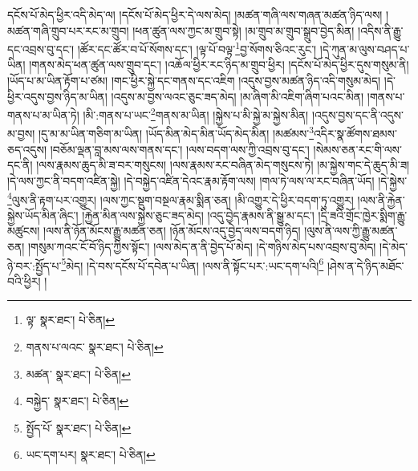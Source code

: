 དངོས་པོ་མེད་ཕྱིར་འདི་མེད་ལ། །དངོས་པོ་མེད་ཕྱིར་དེ་ལས་མེད། །མཚན་གཞི་ལས་གཞན་མཚན་ཉིད་ལས། །མཚན་གཞི་གྲུབ་པར་རང་མ་གྲུབ། །ཕན་ཚུན་ལས་ཀྱང་མ་གྲུབ་སྟེ། །མ་གྲུབ་མ་གྲུབ་སྒྲུབ་བྱེད་མིན། །འདིས་ནི་རྒྱུ་དང་འབྲས་བུ་དང་། །ཚོར་དང་ཚོར་བ་པོ་སོགས་དང་། །ལྟ་པོ་བལྟ་\footnote{ལྟ་  སྣར་ཐང་།  པེ་ཅིན། }བྱ་སོགས་ཅིའང་རུང་། །དེ་ཀུན་མ་ལུས་བཤད་པ་ཡིན། །གནས་མེད་ཕན་ཚུན་ལས་གྲུབ་དང་། །འཆོལ་ཕྱིར་རང་ཉིད་མ་གྲུབ་ཕྱིར། །དངོས་པོ་མེད་ཕྱིར་དུས་གསུམ་ནི། །ཡོད་པ་མ་ཡིན་རྟོག་པ་ཙམ། །གང་ཕྱིར་སྐྱེ་དང་གནས་དང་འཇིག །འདུས་བྱས་མཚན་ཉིད་འདི་གསུམ་མེད། །དེ་ཕྱིར་འདུས་བྱས་ཉིད་མ་ཡིན། །འདུས་མ་བྱས་ལའང་ཅུང་ཟད་མེད། །མ་ཞིག་མི་འཇིག་ཞིག་པའང་མིན། །གནས་པ་གནས་པ་མ་ཡིན་ཏེ། །མི་:གནས་པ་ཡང་\footnote{གནས་པ་ལའང་  སྣར་ཐང་།  པེ་ཅིན། }གནས་མ་ཡིན། །སྐྱེས་པ་མི་སྐྱེ་མ་སྐྱེས་མིན། །འདུས་བྱས་དང་ནི་འདུས་མ་བྱས། །དུ་མ་མ་ཡིན་གཅིག་མ་ཡིན། །ཡོད་མིན་མེད་མིན་ཡོད་མེད་མིན། །མཚམས་\footnote{མཚན་  སྣར་ཐང་།  པེ་ཅིན། }འདིར་སྣ་ཚོགས་ཐམས་ཅད་འདུས། །བཅོམ་ལྡན་བླ་མས་ལས་གནས་དང་། །ལས་བདག་ལས་ཀྱི་འབྲས་བུ་དང་། །སེམས་ཅན་རང་གི་ལས་དང་ནི། །ལས་རྣམས་ཆུད་མི་ཟ་བར་གསུངས། །ལས་རྣམས་རང་བཞིན་མེད་གསུངས་ཏེ། །མ་སྐྱེས་གང་དེ་ཆུད་མི་ཟ། །དེ་ལས་ཀྱང་ནི་བདག་འཛིན་སྐྱེ། །དེ་བསྐྱེད་འཛིན་དེའང་རྣམ་རྟོག་ལས། །གལ་ཏེ་ལས་ལ་རང་བཞིན་ཡོད། །དེ་སྐྱེས་\footnote{བསྐྱེད་  སྣར་ཐང་།  པེ་ཅིན། }ལུས་ནི་རྟག་པར་འགྱུར། །ལས་ཀྱང་སྡུག་བསྔལ་རྣམ་སྨིན་ཅན། །མི་འགྱུར་དེ་ཕྱིར་བདག་ཏུ་འགྱུར། །ལས་ནི་རྐྱེན་སྐྱེས་ཡོད་མིན་ཞིང་། །རྐྱེན་མིན་ལས་སྐྱེས་ཅུང་ཟད་མེད། །འདུ་བྱེད་རྣམས་ནི་སྒྱུ་མ་དང་། །དྲི་ཟའི་གྲོང་ཁྱེར་སྨིག་རྒྱུ་མཚུངས། །ལས་ནི་ཉོན་མོངས་རྒྱུ་མཚན་ཅན། །ཉོན་མོངས་འདུ་བྱེད་ལས་བདག་ཉིད། །ལུས་ནི་ལས་ཀྱི་རྒྱུ་མཚན་ཅན། །གསུམ་ཀའང་ངོ་བོ་ཉིད་ཀྱིས་སྟོང་། །ལས་མེད་ན་ནི་བྱེད་པོ་མེད། །དེ་གཉིས་མེད་པས་འབྲས་བུ་མེད། །དེ་མེད་ཉེ་བར་:སྤྱོད་པ་\footnote{སྤྱོད་པོ་  སྣར་ཐང་།  པེ་ཅིན། }མེད། །དེ་བས་དངོས་པོ་དབེན་པ་ཡིན། །ལས་ནི་སྟོང་པར་:ཡང་དག་པའི།\footnote{ཡང་དག་པར།  སྣར་ཐང་།  པེ་ཅིན། } །ཤེས་ན་དེ་ཉིད་མཐོང་བའི་ཕྱིར། །
